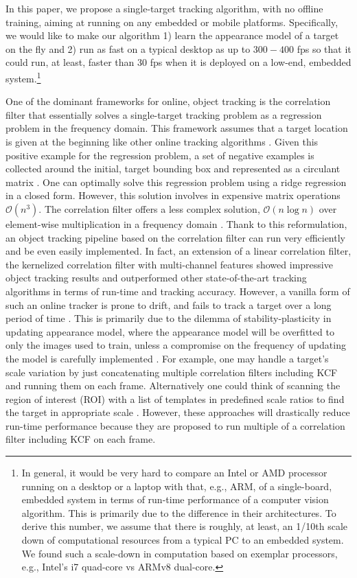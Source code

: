\documentclass{bmvc2k}
\begin{document}
In this paper, we propose a single-target tracking algorithm, with no
offline training, aiming at running on any embedded or mobile
platforms. Specifically, we would like to make our algorithm 1) learn
the appearance model of a target on the fly and 2) run as fast on a
typical desktop as up to $300-400$ fps so that it could run, at least,
faster than 30 fps when it is deployed on a low-end, embedded
system.\footnote{In general, it would be very hard to compare an Intel
  or AMD processor running on a desktop or a laptop with that, e.g.,
  ARM, of a single-board, embedded system in terms of run-time
  performance of a computer vision algorithm. This is primarily due to
  the difference in their architectures. To derive this number, we
  assume that there is roughly, at least, an 1/10th scale down of
  computational resources from a typical PC to an embedded system. We
  found such a scale-down in computation based on exemplar processors,
  e.g., Intel's i7 quad-core vs ARMv8 dual-core.}

One of the dominant frameworks for online, object tracking is the
correlation filter that essentially solves a single-target tracking
problem as a regression problem in the frequency domain. This
framework assumes that a target location is given at the beginning
like other online tracking algorithms
\cite{smeulders2014survey}. Given this positive example for the
regression problem, a set of negative examples is collected around the
initial, target bounding box and represented as a circulant matrix
\cite{henriques2015high}. One can optimally solve this regression
problem using a ridge regression in a closed form. However, this
solution involves in expensive matrix operations
$\mathcal{O}(n^{3})$. The correlation filter offers a less complex
solution, $\mathcal{O}(n\log n)$ over element-wise multiplication in a
frequency domain \cite{bolme2010visual,henriques2015high}. Thank to
this reformulation, an object tracking pipeline based on the
correlation filter can run very efficiently and be even easily
implemented. In fact, an extension of a linear correlation filter, the
kernelized correlation filter with multi-channel features
\cite{henriques2015high} showed impressive object tracking results and
outperformed other state-of-the-art tracking algorithms in terms of
run-time and tracking accuracy. However, a vanilla form of such an
online tracker is prone to drift, and fails to track a target over a
long period of time \cite{henriques2015high}. This is primarily due to
the dilemma of stability-plasticity in updating appearance model,
where the appearance model will be overfitted to only the images used
to train, unless a compromise on the frequency of updating the model
is carefully implemented \cite{santner2010prost}. For example, one may
handle a target's scale variation by just concatenating multiple
correlation filters including KCF and running them on each
frame. Alternatively one could think of scanning the region of
interest (ROI) with a list of templates in predefined scale ratios to
find the target in appropriate scale
\cite{henriques2015high,tang2015multi,ma2015long,bibi2015multi,li2014scale}. However,
these approaches will drastically reduce run-time performance because
they are proposed to run multiple of a correlation filter including
KCF on each frame.
\end{document}
